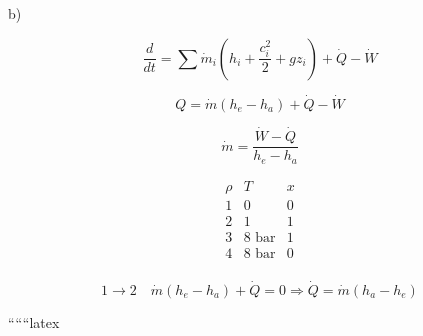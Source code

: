 b)

\[
\frac{d}{dt} = \sum \dot{m}_i (h_i + \frac{c_i^2}{2} + g z_i) + \dot{Q} - \dot{W}
\]

\[
Q = \dot{m} (h_e - h_a) + \dot{Q} - \dot{W}
\]

\[
\dot{m} = \frac{\dot{W} - \dot{Q}}{h_e - h_a}
\]

\[
\begin{array}{ccc}
\rho & T & x \\
1 & 0 & 0 \\
2 & 1 & 1 \\
3 & 8 \text{ bar} & 1 \\
4 & 8 \text{ bar} & 0 \\
\end{array}
\]


\[
1 \rightarrow 2 \quad \dot{m} (h_e - h_a) + \dot{Q} = 0 \Rightarrow \dot{Q} = \dot{m} (h_a - h_e)
\]

``````latex